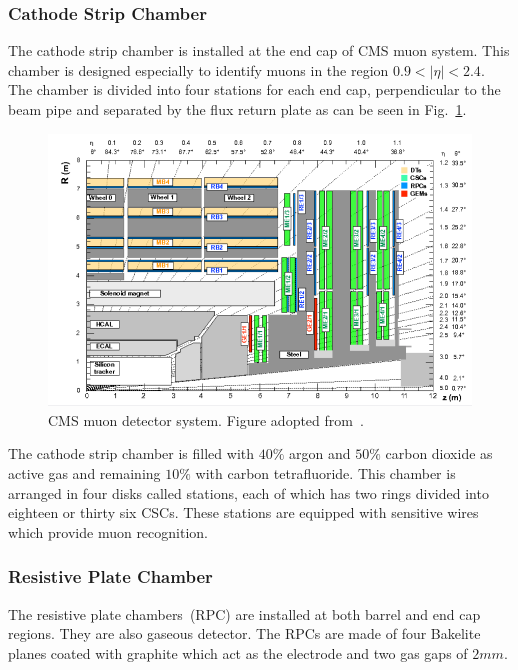 \subsubsection{Cathode Strip Chamber}
The cathode strip chamber is installed at the end cap of CMS muon system. This chamber is designed especially to identify muons in the region $0.9 < |\eta| <  2.4$. The chamber is divided into four stations for each end cap, perpendicular to the beam pipe and separated by the flux return plate as can be seen in Fig.~\ref{csc1}.\\ 
\begin{figure}[H]
\centering
\includegraphics[scale=0.5]{chapter2/csc1.png}
\caption{CMS muon detector system. Figure adopted from~\cite{Sirunyan_2018}.}
\label{csc1}

\end{figure}
The cathode strip chamber is filled with $40\%$ argon and $50\%$ carbon dioxide as active gas and remaining $10\%$ with carbon tetrafluoride. This chamber is arranged in four disks called stations, each of which has two rings divided into eighteen or thirty six CSCs. These stations are equipped with sensitive wires which provide muon recognition.

\subsubsection{Resistive Plate Chamber}
The resistive plate chambers~(RPC) are installed at both barrel and end cap regions. They are also gaseous detector. The RPCs are made of four Bakelite planes coated with graphite which act as the electrode and two gas gaps of $2mm$.\\

